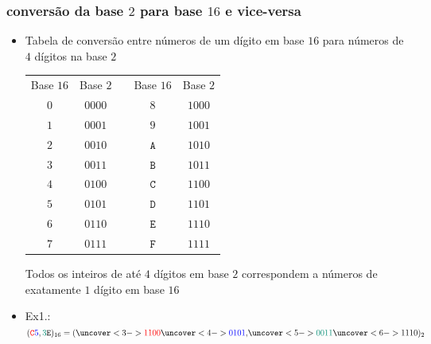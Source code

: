 \documentclass{beamer}
\def\A{\texttt{A}}
\def\B{\texttt{B}}
\def\C{\texttt{C}}
\def\D{\texttt{D}}
\def\E{\texttt{E}}
\def\F{\texttt{F}}
\begin{document}
\begin{frame}
\frametitle{conversão da base $2$ para base $16$ e vice-versa} 

\begin{itemize}
\item Tabela de conversão entre números de um dígito em base $16$ para números de $4$ dígitos na base $2$\\
\begin{minipage}{0.6\textwidth}
\begin{tabular}{cc r cc}
Base $16$ & Base $2$ & & Base $16$ & Base $2$ \\
\cline{1-2}\cline{4-5}
$0$       & $0000$   & & $8$       & $1000$  \\
\cline{1-2}\cline{4-5}
$1$       & $0001$   & & $9$       & $1001$ \\
\cline{1-2}\cline{4-5}
$2$       & $0010$   & & $\A{}$    & $1010$ \\
\cline{1-2}\cline{4-5}
$3$       & $0011$   & & $\B{}$    & $1011$ \\
\cline{1-2}\cline{4-5}
$4$       & $0100$   & & $\C{}$    & $1100$ \\
\cline{1-2}\cline{4-5}
$5$       & $0101$   & & $\D{}$    & $1101$ \\
\cline{1-2}\cline{4-5}
$6$       & $0110$   & & $\E{}$    & $1110$ \\
\cline{1-2}\cline{4-5}
$7$       & $0111$   & & $\F{}$    & $1111$
\end{tabular}
\end{minipage}
\pause
\begin{minipage}{0.32\textwidth}
Todos os inteiros de até $4$ dígitos em base $2$ correspondem a números de exatamente $1$ dígito em base $16$
\end{minipage}

\item Ex1.: $({\color{red}\C{}}{\color{blue}5},{\color{pinegreen}3}\E{})_{16} = ( \uncover<3->{{\color{red}1100}}\uncover<4->{{\color{blue}0101},}\uncover<5->{{\color{pinegreen}0011}\uncover<6->{1110}} )_2$
\end{itemize}

\end{frame}
\end{document}
